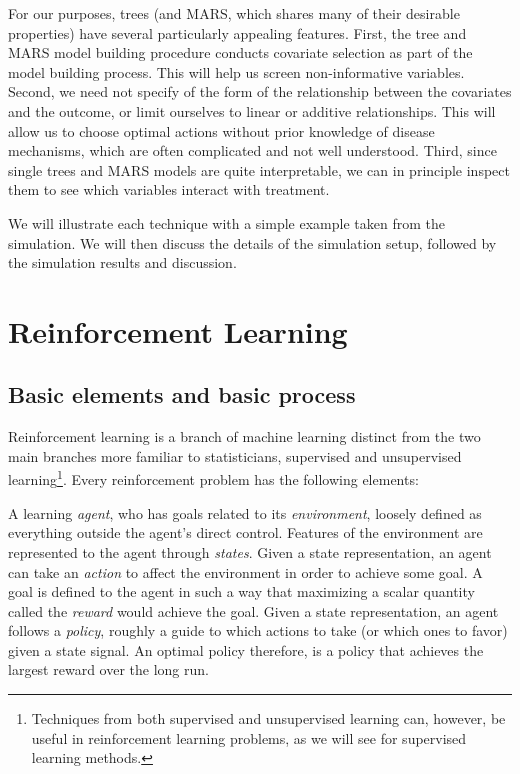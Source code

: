 \documentclass[12pt]{article}
\begin{document}
For our purposes, trees (and MARS, which shares many of their desirable properties) have several particularly appealing features. First, the tree and MARS model building procedure conducts covariate selection as part of the model building process. This will help us screen non-informative variables. Second, we need not specify of the form of the relationship between the covariates and the outcome, or limit ourselves to linear or additive relationships. This will allow us to choose optimal actions without prior knowledge of disease mechanisms, which are often complicated and not well understood. Third, since single trees and MARS models are quite interpretable, we can in principle inspect them to see which variables interact with treatment.

We will illustrate each technique with a simple example taken from the simulation. We will then discuss the details of the simulation setup, followed by the simulation results and discussion.


\section{Reinforcement Learning} %
\label{sec:reinforcement_learning}

\subsection{Basic elements and basic process} %
\label{sub:basic_process}

Reinforcement learning is a branch of machine learning distinct from the two main branches more familiar to statisticians, supervised and unsupervised learning\footnote{Techniques from both supervised and unsupervised learning can, however, be useful in reinforcement learning problems, as we will see for supervised learning methods.}. Every reinforcement problem has the following elements:

A learning \emph{agent}, who has goals related to its \emph{environment}, loosely defined as everything outside the agent's direct control. Features of the environment are represented to the agent through \emph{states}. Given a state representation, an agent can take an \emph{action} to affect the environment in order to achieve some goal. A goal is defined to the agent in such a way that maximizing a scalar quantity called the \emph{reward} would achieve the goal. Given a state representation, an agent follows a \emph{policy}, roughly a guide to which actions to take (or which ones to favor) given a state signal. An optimal policy therefore, is a policy that achieves the largest reward over the long run.
\end{document}
